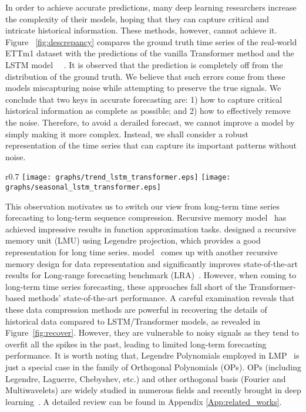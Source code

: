 \documentclass{article}
\begin{document}
In order to achieve accurate predictions, many deep learning researchers increase the complexity of their models, hoping that they can capture critical and intricate historical information. These methods, however, cannot achieve it. Figure ~\ref{fig:descrepancy} compares the ground truth time series of the real-world ETTm1 dataset with the predictions of the vanilla Transformer method and the LSTM model~\cite{attention_is_all_you_need,hochreiter1997long}~ \cite{ haoyietal-informer-2021}. It is observed that the prediction is completely off from the distribution of the ground truth. We believe that such errors come from these models miscapturing noise while attempting to preserve the true signals. We conclude that two keys in accurate forecasting are: 1) how to capture critical historical information as complete as possible; and 2) how to effectively remove the noise. 
Therefore, to avoid a derailed forecast, we cannot improve a model by simply making it more complex. Instead, we shall consider a robust representation of the time series that can capture its important patterns without noise.
\begin{wrapfigure}[12]{r}{0.7\textwidth}
\vskip -0.12in
\centering
\texttt{[image: graphs/trend\_lstm\_transformer.eps]}
\texttt{[image: graphs/seasonal\_lstm\_transformer.eps]}
\vskip -0.10in
\caption{The discrepancy between ground truth and forecasting output from vanilla Transformer and LSTM on a real-world ETTh1 dataset Left: trend shift. Right: seasonal shift.}\label{fig:descrepancy}
\vskip -0.20in
\end{wrapfigure}

This observation motivates us to switch our view from long-term time series forecasting to long-term sequence compression. Recursive memory model~\cite{LMU,S4,LSSL,Hippo} has achieved impressive results in function approximation tasks. \cite{LMU} designed a recursive memory unit (LMU) using Legendre projection, which provides a good representation for long time series.  model~\cite{S4} comes up with another recursive memory design for data representation and significantly improves state-of-the-art results for Long-range forecasting benchmark (LRA)~\cite{LRA}. However, when coming to long-term time series forecasting, these approaches fall short of the Transformer-based methods' state-of-the-art performance. A careful examination reveals that these data compression methods are powerful in recovering the details of historical data compared to LSTM/Transformer models, as revealed in Figure~\ref{fig:recover}. However, they are vulnerable to noisy signals as they tend to overfit all the spikes in the past, leading to limited long-term forecasting performance. It is worth noting that, Legendre Polynomials employed in LMP~\cite{LMU} is just a special case in the family of Orthogonal Polynomials (OPs). OPs (including Legendre, Laguerre, Chebyshev, etc.) and other orthogonal basis (Fourier and Multiwavelets) are widely studied in numerous fields and recently brought in deep learning~\cite{wang2018multilevel,Multiwavelet-based-Operator-Learning,FedFormer,LMU,Hippo}. A detailed review can be found in Appendix \ref{App:related_works}.
\end{document}
